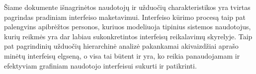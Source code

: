 Šiame dokumente išnagrinėtos naudotojų ir užduočių charakteristikos yra tvirtas pagrindas
pradiniam interfeiso maketavimui. Interfeiso kūrimo procesą taip pat palengvins apibrėžtos
personos, kuriuos modeliuoja tipinius sistemos naudotojus, kurių reikmės yra dar labiau
sukonkretintos interfeisų reikalavimų skyrelyje. Taip pat pagrindinių užduočių hierarchinė
analizė pakankamai akivaizdžiai aprašo minėtų interfeisų elgseną, o visa tai būtent ir yra, ko
reikia panaudojamam ir efektyviam grafiniam naudotojo interfeisui sukurti ir patikrinti.

